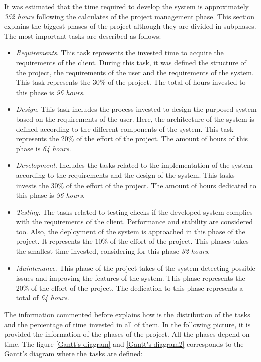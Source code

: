 It was estimated that the time required to develop the system is approximately \textit{352 hours} following the calculates of the project management phase. This section explains the biggest phases of the project although they are divided in subphases. The most important tasks are described as follows:

\begin{itemize}

\item \textit{Requirements}. This task represents the invested time to acquire the requirements of the client. During this task, it was defined the structure of the project, the requirements of the user and the requirements of the system. This task represents the 30\% of the project. The total of hours invested to this phase is \textit{96 hours}.
\item \textit{Design}. This task includes the process invested to design the purposed system based on the requirements of the user. Here, the architecture of the system is defined according to the different components of the system. This task represents the 20\% of the effort of the project. The amount of hours of this phase is \textit{64 hours}.
\item \textit{Development}. Includes the tasks related to the implementation of the system according to the requirements and the design of the system. This tasks invests the 30\% of the effort of the project. The amount of hours dedicated to this phase is \textit{96 hours}.
\item \textit{Testing}. The tasks related to testing checks if the developed system complies with the requirements of the client. Performance and stability are considered too. Also, the deployment of the system is approached in this phase of the project. It represents the 10\% of the effort of the project. This phases takes the smallest time invested, considering for this phase \textit{32 hours}.
\item \textit{Maintenance}. This phase of the project takes of the system detecting possible issues and improving the features of the system. This phase represents the 20\% of the effort of the project. The dedication to this phase represents a total of \textit{64 hours}.

\end{itemize}

The information commented before explains how is the distribution of the tasks and the percentage of time invested in all of them. In the following picture, it is provided the information of the phases of the project. All the phases depend on time. The figure \ref{Gantt's diagram} and \ref{Gantt's diagram2} corresponds to the Gantt's diagram where the tasks are defined:\\

